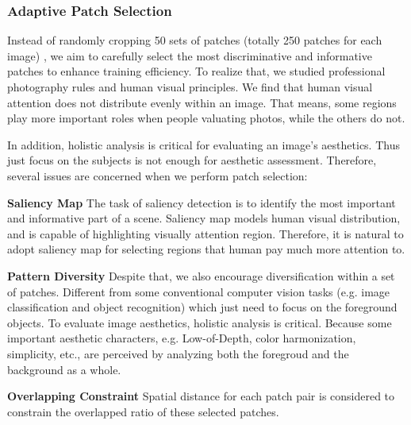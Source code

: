 \documentclass[10pt,twocolumn,letterpaper]{article}
\begin{document}
\subsubsection{Adaptive Patch Selection}
Instead of randomly cropping 50 sets of patches (totally 250 patches for each image) \cite{Lu:2015:ICCV}, we aim to carefully select the most discriminative and informative patches to enhance training efficiency. To realize that, we studied professional photography rules and human visual principles. 
We find that human visual attention does not distribute evenly within an image.
That means, some regions play more important roles when people valuating
photos, while the others do not. 

In addition, holistic analysis is critical 
for evaluating an image's aesthetics. Thus just focus on the subjects is not enough for aesthetic assessment. Therefore, several issues are concerned when we perform patch selection:

\textbf{Saliency Map} The task of saliency detection is to identify the most important and informative part of a scene. Saliency map models human visual distribution, and is capable of highlighting visually attention region. Therefore, it is natural to adopt saliency map for selecting regions that human pay much more attention to.

\textbf{Pattern Diversity} Despite that, we also encourage diversification within a set of patches. Different from some conventional computer vision tasks (e.g. image classification and object recognition) which just need to focus on the foreground objects. To evaluate image aesthetics, holistic analysis is critical. Because some important aesthetic characters, e.g. Low-of-Depth, color harmonization, simplicity, etc., are perceived by analyzing both the foregroud and the background as a whole. 

\textbf{Overlapping Constraint} Spatial distance for each patch pair is considered to constrain the overlapped ratio of these selected patches. 
\end{document}
